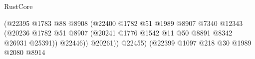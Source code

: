 \begin{lexlean}{RustCore}
\begin{coremodule}
                                                                    (@22395
                                                                      @1783
                                                                      @88
                                                                      @8908
                                                                      (@22400
                                                                        @1782
                                                                        @51
                                                                        @1989
                                                                        @8907
                                                                        @7340
                                                                        @12343
                                                                        (@20236
                                                                          @1782
                                                                          @51
                                                                          @8907
                                                                          (@20241
                                                                            @1776
                                                                            @1542
                                                                            @11
                                                                            @50
                                                                            @8891
                                                                            @8342
                                                                            @26931
                                                                            @25391))
                                                                        @22446))
                                                                    @20261))
                                                                @22455)
                                                              (@22399
                                                                @1097
                                                                @218
                                                                @30
                                                                @1989
                                                                @2080
                                                                @8914

\end{coremodule}
\end{lexlean}
